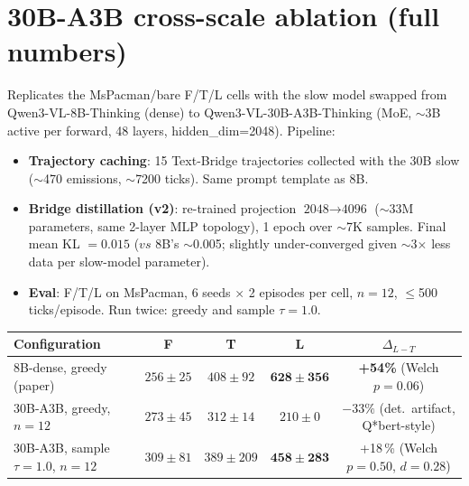 \documentclass[11pt]{article}
\begin{document}
\section{30B-A3B cross-scale ablation (full numbers)}
\label{app:scaling_30b}

Replicates the MsPacman/bare F/T/L cells with the slow model swapped from Qwen3-VL-8B-Thinking (dense) to Qwen3-VL-30B-A3B-Thinking (MoE, $\sim$3B active per forward, 48 layers, hidden\_dim=2048). Pipeline:

\begin{itemize}[topsep=0pt,itemsep=0pt,leftmargin=*]
\item \textbf{Trajectory caching}: 15 Text-Bridge trajectories collected with the 30B slow ($\sim$470 emissions, $\sim$7200 ticks). Same prompt template as 8B.
\item \textbf{Bridge distillation (v2)}: re-trained projection $\text{2048} \to \text{4096}$ ($\sim$33M parameters, same 2-layer MLP topology), 1 epoch over $\sim$7K samples. Final mean KL $=0.015$ ($vs$ 8B's $\sim$0.005; slightly under-converged given $\sim$3$\times$ less data per slow-model parameter).
\item \textbf{Eval}: F/T/L on MsPacman, 6 seeds $\times$ 2 episodes per cell, $n=12$, $\le$500 ticks/episode. Run twice: greedy and sample $\tau\!=\!1.0$.
\end{itemize}

\smallskip\noindent
{\small\setlength{\tabcolsep}{4pt}
\begin{tabular}{lcccc}
\toprule
Configuration & F & T & L & $\Delta_{L-T}$ \\
\midrule
8B-dense, greedy (paper)            & $256\pm25$  & $408\pm92$  & $\mathbf{628\pm356}$ & \textbf{+54\%} (Welch $p\!=\!0.06$) \\
\midrule
30B-A3B, greedy, $n=12$             & $273\pm45$  & $312\pm14$  & $210\pm0$           & $-33\%$ (det.\ artifact, Q*bert-style)\\
30B-A3B, sample $\tau=1.0$, $n=12$  & $309\pm81$  & $389\pm209$ & $\mathbf{458\pm283}$ & +18\,\% (Welch $p\!=\!0.50$, $d=0.28$)\\
\bottomrule
\end{tabular}}\smallskip
\end{document}
